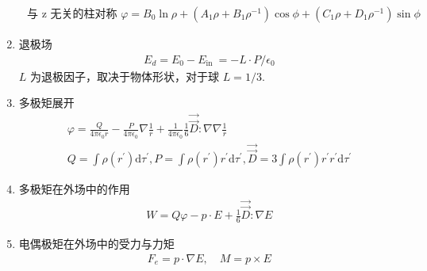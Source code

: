 \documentclass[../../note.tex]{subfiles}
\begin{document}
\begin{enumerate}
\begin{align}
\text { 与 } \mathrm{z} \text { 无关的柱对称 } \varphi=B_0 \ln \rho+\left(A_1 \rho+B_1 \rho^{-1}\right) \cos \phi+\left(C_1 \rho+D_1 \rho^{-1}\right) \sin \phi
\end{align}
		\item 退极场
	\begin{align}
	{E}_d={E}_0-{E}_{\text {in }}=-L \cdot {P} / \epsilon_0
	\end{align}
	$L$ 为退极因子，取决于物体形状，对于球 $L=1 / 3$.
		\item 多极矩展开
\begin{align}
		\varphi=\frac{Q}{4 \pi \epsilon_0 r}-\frac{P}{4 \pi \epsilon_0} \nabla \frac{1}{r}+\frac{1}{4 \pi \epsilon_0} \frac{1}{6} \overrightarrow{\vec{D}}: \nabla \nabla \frac{1}{r} \\
		Q=\int \rho\left(r^{\prime}\right) \mathrm{d} \tau^{\prime}, {P}=\int \rho\left(r^{\prime}\right) r^{\prime} \mathrm{d} \tau^{\prime}, \overrightarrow{\vec{D}}=3 \int \rho\left(r^{\prime}\right) {r}^{\prime} {r}^{\prime} \mathrm{d} \tau^{\prime}
\end{align}
		\item 多极矩在外场中的作用
	\begin{align}
	W=Q \varphi-p \cdot {E}+\frac{1}{6} \overrightarrow{\vec{D}}: \nabla {E}
	\end{align}
		\item 电偶极矩在外场中的受力与力矩
	\begin{align}
	{F}_e=p \cdot \nabla {E}, \quad {M}=p \times {E}
	\end{align}
	
\end{enumerate}
\end{document}
